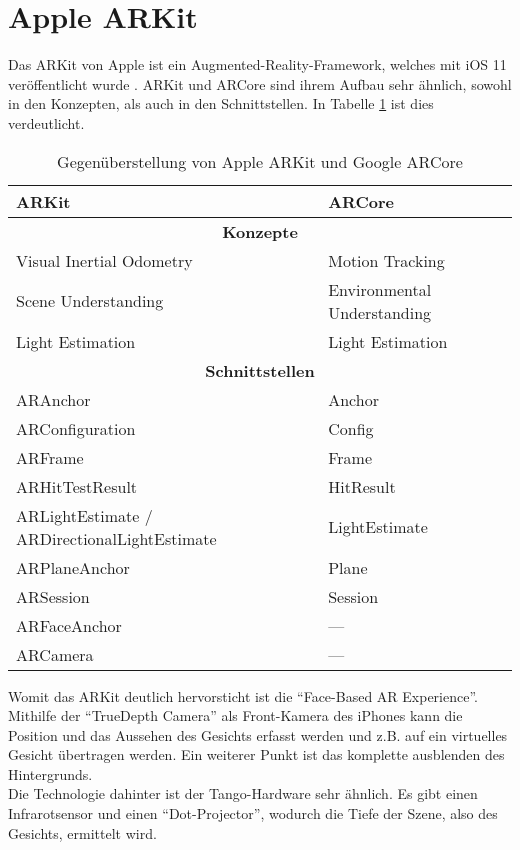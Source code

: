 
\section{Apple ARKit}
Das ARKit von Apple ist ein Augmented-Reality-Framework, welches mit iOS 11 veröffentlicht wurde \cite{apple_arkit}. ARKit und ARCore sind ihrem Aufbau sehr ähnlich, sowohl in den Konzepten, als auch in den Schnittstellen. In Tabelle \ref{arkit_vs_arcore} ist dies verdeutlicht.

\begin{table}[h]
	\centering
	\begin{tabular}{|p{4cm}|p{4cm}|}
		\hline
		\textbf{ARKit} & \textbf{ARCore}\\
		\hline
		\multicolumn{2}{|c|}{\textbf{Konzepte}}\\
		\hline
		Visual Inertial Odometry & Motion Tracking\\
		Scene Understanding & Environmental Understanding\\
		Light Estimation & Light Estimation\\
		\hline
		\multicolumn{2}{|c|}{\textbf{Schnittstellen}}\\
		\hline
		ARAnchor & Anchor \\
		ARConfiguration & Config\\
		ARFrame & Frame\\
		ARHitTestResult & HitResult\\
		ARLightEstimate /
		\newline ARDirectionalLightEstimate & LightEstimate\newline\\
		ARPlaneAnchor & Plane\\
		ARSession & Session\\
		ARFaceAnchor & ---\\
		ARCamera & ---\\
		\hline
	\end{tabular}
	\caption{Gegenüberstellung von Apple ARKit und Google ARCore}
	\label{arkit_vs_arcore}
\end{table}

Womit das ARKit deutlich hervorsticht ist die "`Face-Based AR Experience"'. Mithilfe der "`TrueDepth Camera"' als Front-Kamera des iPhones kann die Position und das Aussehen des Gesichts erfasst werden und z.B. auf ein virtuelles Gesicht übertragen werden. Ein weiterer Punkt ist das komplette ausblenden des Hintergrunds.\cite{iphoneX}\\
Die Technologie dahinter ist der Tango-Hardware sehr ähnlich. Es gibt einen Infrarotsensor und einen "`Dot-Projector"', wodurch die Tiefe der Szene, also des Gesichts, ermittelt wird. \cite{iphoneX_display}